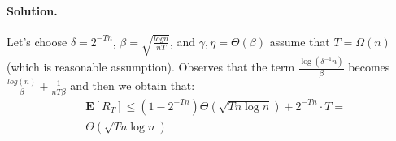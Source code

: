 \documentclass{article}
\newcommand{\expp}[1]{ \mathbf{E} \left[ {#1} \right]}
\begin{document}
\begin{multicols*}{2}
  \paragraph{Solution.} Let's choose $\delta = 2^{-Tn}$, $\beta = \sqrt{\frac{log n }{nT}}$, and $\gamma, \eta = \Theta\left( \beta \right)$ assume that $T = \Omega(n)$ (which is reasonable assumption). Observes that the term $\frac{\log\left( \delta^{-1}n \right)}{\beta}$ becomes $ \frac{log\left( n \right)}{\beta} + \frac{1}{nT\beta} $ and then we obtain that:  
  \begin{equation*}
    \begin{split}
      & \expp{R_{T}} \le \left( 1 - 2^{-Tn} \right)\Theta\left( \sqrt{ Tn\log n} \right)+ 2^{-Tn} \cdot T = \\ 
      & \Theta\left( \sqrt{ Tn\log n} \right)
    \end{split}
  \end{equation*}
\end{multicols*}
  \printbibliography 
\end{document}
